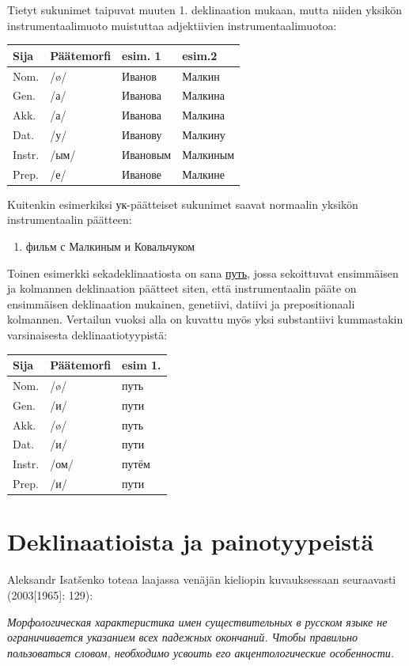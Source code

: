 \documentclass[]{scrreprt}
\providecommand{\tightlist}{%
  \setlength{\itemsep}{0pt}\setlength{\parskip}{0pt}}
\begin{document}
Tietyt sukunimet taipuvat muuten 1. deklinaation mukaan, mutta niiden
yksikön instrumentaalimuoto muistuttaa adjektiivien
instrumentaalimuotoa:

\begin{longtable}[c]{@{}llll@{}}
\toprule
Sija & Päätemorfi & esim. 1 & esim.2\tabularnewline
\midrule
\endhead
Nom. & /ø/ & Иванов & Малкин\tabularnewline
Gen. & /а/ & Иванова & Малкина\tabularnewline
Akk. & /а/ & Иванова & Малкина\tabularnewline
Dat. & /у/ & Иванову & Малкину\tabularnewline
Instr. & /ым/ & Ивановым & Малкиным\tabularnewline
Prep. & /е/ & Иванове & Малкине\tabularnewline
\bottomrule
\end{longtable}

Kuitenkin esimerkiksi ук-päätteiset sukunimet saavat normaalin yksikön
instrumentaalin päätteen:

\begin{enumerate}
\def\labelenumi{(\arabic{enumi})}
\setcounter{enumi}{10}
\tightlist
\item
  фильм с Малкиным и Ковальчуком
\end{enumerate}

Toinen esimerkki sekadeklinaatiosta on sana
\href{https://ru.wiktionary.org/wiki/\%D0\%BF\%D1\%83\%D1\%82\%D1\%8C}{путь},
jossa sekoittuvat ensimmäisen ja kolmannen deklinaation päätteet siten,
että instrumentaalin pääte on ensimmäisen deklinaation mukainen,
genetiivi, datiivi ja prepositionaali kolmannen. Vertailun vuoksi alla
on kuvattu myös yksi substantiivi kummastakin varsinaisesta
deklinaatiotyypistä:

\begin{longtable}[c]{@{}lll@{}}
\toprule
Sija & Päätemorfi & esim 1.\tabularnewline
\midrule
\endhead
Nom. & /ø/ & путь\tabularnewline
Gen. & /и/ & пути\tabularnewline
Akk. & /ø/ & путь\tabularnewline
Dat. & /и/ & пути\tabularnewline
Instr. & /ом/ & путём\tabularnewline
Prep. & /и/ & пути\tabularnewline
\bottomrule
\end{longtable}

\section{Deklinaatioista ja
painotyypeistä}\label{deklinaatioista-ja-painotyypeistuxe4}

Aleksandr Isatšenko toteaa laajassa venäjän kieliopin kuvauksessaan
seuraavasti (2003{[}1965{]}: 129):

\emph{Морфологическая характеристика имен существительных в русском
языке не ограничивается указанием всех падежных окончаний. Чтобы
правильно пользоваться словом, необходимо усвоить его акцентологические
особенности.}
\end{document}
